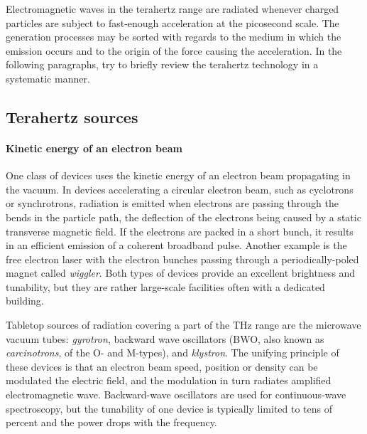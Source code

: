 
Electromagnetic waves in the terahertz range are radiated whenever charged particles are subject to fast-enough acceleration at the picosecond scale. 
The generation processes may be sorted with regards to the medium in which the emission occurs and to the origin of the force causing the acceleration.  %
In the following paragraphs, try to briefly review the terahertz technology in a systematic manner.




\subsection{Terahertz sources}
\paragraph{Kinetic energy of an electron beam} %
One class of devices uses the kinetic energy of an electron beam propagating in the vacuum. In devices accelerating a circular electron beam, such as cyclotrons or synchrotrons, radiation is emitted when electrons are passing through the bends in the particle path, the deflection of the electrons being caused by a static transverse magnetic field. If the electrons are packed in a short bunch, it results in an efficient emission of a coherent broadband pulse. %
Another example is the free electron laser with the electron bunches %
passing through a periodically-poled magnet called \textit{wiggler}. 
Both types of devices provide an excellent brightness and tunability, but they are rather large-scale facilities often with a dedicated building. 

Tabletop sources of radiation covering a part of the THz range are the microwave vacuum tubes: \textit{gyrotron}, backward wave oscillators (BWO, also known as \textit{carcinotrons}, of the O- and M-types), and \textit{klystron}. The unifying principle of these devices is that an electron beam speed, position or density can be modulated the electric field, and the modulation in turn radiates amplified electromagnetic wave. Backward-wave oscillators are %
 used for continuous-wave spectroscopy, but the tunability of one device is typically limited to tens of percent and the power drops with the frequency.

